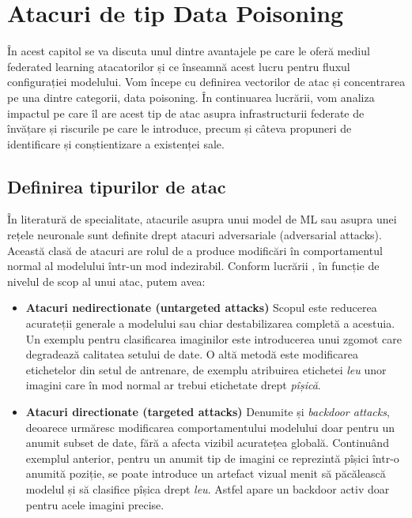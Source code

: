 \documentclass[../../main.tex]{subfiles}
\begin{document}
\newpage
\section{Atacuri de tip Data Poisoning}

În acest capitol se va discuta unul dintre avantajele pe care le oferă mediul federated learning atacatorilor și ce înseamnă acest lucru pentru fluxul configurației modelului. Vom începe cu definirea
vectorilor de atac și concentrarea pe una dintre categorii, data poisoning. În continuarea lucrării, vom analiza impactul pe care îl are acest tip de atac asupra infrastructurii federate de învățare și riscurile pe care le introduce, precum și câteva propuneri de identificare și conștientizare a existenței sale.

    \subsection{Definirea tipurilor de atac}

    
    În literatură de specialitate, atacurile asupra unui model de ML sau asupra unei rețele neuronale sunt definite drept atacuri adversariale (adversarial attacks). Această clasă de atacuri are rolul de a produce modificări în comportamentul normal al modelului într-un mod indezirabil. Conform lucrării \cite{kairouz2021federated}, în funcție de nivelul de scop al unui atac, putem avea:

    \begin{itemize}

        \item \textbf{Atacuri nedirectionate (untargeted attacks)}  
        Scopul este reducerea acurate\-ții generale a modelului sau chiar destabilizarea completă a acestuia.  
        Un exemplu pentru clasificarea imaginilor este introducerea unui zgomot care degradează calitatea setului de date.  
        O altă metodă este modificarea etichetelor din setul de antrenare, de exemplu atribuirea etichetei \textit{leu} unor imagini care în mod normal ar trebui etichetate drept \textit{pîșică}.
    
        \item \textbf{Atacuri directionate (targeted attacks)}  
        Denumite și \textit{backdoor attacks}, deoarece urmăresc modificarea comportamentului modelului doar pentru un anumit subset de date, fără a afecta vizibil acuratețea globală.  
        Continuând exemplul anterior, pentru un anumit tip de imagini ce reprezintă pîșici într-o anumită poziție, se poate introduce un artefact vizual menit să păcălească modelul și să clasifice pîșica drept \textit{leu}. Astfel apare un backdoor activ doar pentru acele imagini precise.
    
    \end{itemize}
    
\end{document}
